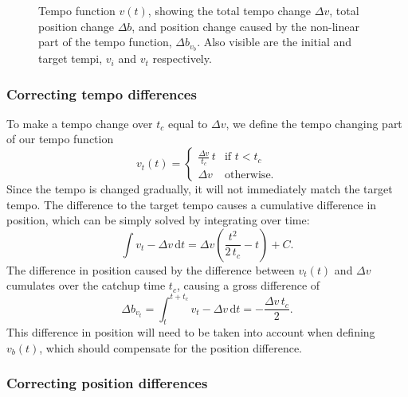 \begin{figure}
\begin{center}

\caption{
Tempo function $v(t)$,
showing the total tempo change $\Delta v$,
total position change $\Delta b$,
and position change caused by the non-linear
part of the tempo function, $\Delta b_{v_b}$.
Also visible are the initial and target tempi,
$v_i$ and $v_t$ respectively.
}
\label{fig:tempo_function}
\end{center}
\end{figure}

\subsubsection*{Correcting tempo differences}

To make a tempo change
over $t_c$ equal to $\Delta v$,
we define the tempo changing part of our tempo function
\begin{equation}
\label{eq:tempo_function_tempo_correction}
v_t(t) =
\begin{cases}
\frac{\Delta v}{t_c} \, t & \text{if } t < t_c \\
\Delta v & \text{otherwise}.
\end{cases}
\end{equation}
Since the tempo is changed gradually,
it will not immediately match the target tempo.
The difference to the target tempo causes
a cumulative difference in position,
which can be simply solved by integrating over time:
\begin{equation}
\label{eq:linear_tempo_change_pos_diff}
\int v_t - \Delta v \, \mathrm{d}t =
\Delta v \left( \frac{t^2}{2 \, t_c} - t \right) + C.
\end{equation}
The difference in position
caused by the difference between $v_t(t)$ and $\Delta v$
cumulates over the catchup time $t_c$,
causing a gross difference of
\begin{equation}
\Delta b_{v_t} =
\int_t^{t + t_c} v_t - \Delta v \, \mathrm{d}t =
-\frac{\Delta v \, t_c }{2}.
\end{equation}
This difference in position will need to be taken into account
when defining $v_b(t)$,
which should compensate for the position difference.

\subsubsection*{Correcting position differences}

